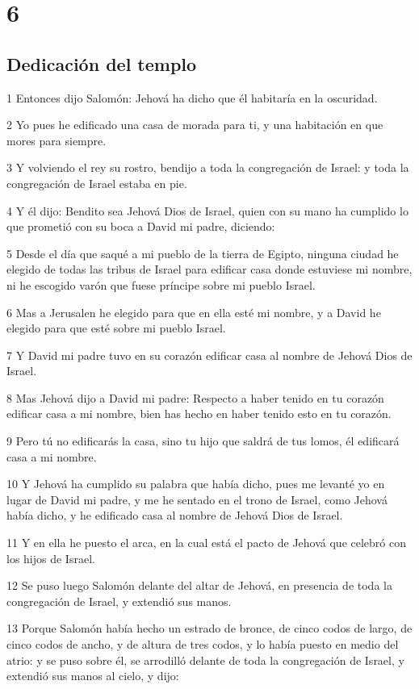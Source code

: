 \chapter{6}

\section*{Dedicación del templo}

\par 1 Entonces dijo Salomón: Jehová ha dicho que él habitaría en la oscuridad.
\par 2 Yo pues he edificado una casa de morada para ti, y una habitación en que mores para siempre.
\par 3 Y volviendo el rey su rostro, bendijo  a  toda la congregación de Israel: y toda la congregación de Israel estaba en pie.
\par 4 Y él dijo: Bendito sea Jehová Dios de Israel, quien con su mano ha cumplido lo que prometió con su boca  a  David mi padre, diciendo:
\par 5 Desde el día que saqué a mi pueblo de la tierra de Egipto, ninguna ciudad he elegido de todas las tribus de Israel para edificar casa donde estuviese mi nombre, ni he escogido varón que fuese príncipe sobre mi pueblo Israel.
\par 6 Mas  a  Jerusalen he elegido para que en ella esté mi nombre, y  a  David he elegido para que esté sobre mi pueblo Israel.
\par 7 Y David mi padre tuvo en su corazón edificar casa al nombre de Jehová Dios de Israel.
\par 8 Mas Jehová dijo  a  David mi padre: Respecto  a  haber tenido en tu corazón edificar casa  a  mi nombre, bien has hecho en haber tenido esto en tu corazón.
\par 9 Pero tú no edificarás la casa, sino tu hijo que saldrá de tus lomos, él edificará casa  a  mi nombre. 
\par 10 Y Jehová ha cumplido su palabra que había dicho, pues me levanté yo en lugar de David mi padre, y me he sentado en el trono de Israel, como Jehová había dicho, y he edificado casa al nombre de Jehová Dios de Israel.
\par 11 Y en ella he puesto el arca, en la cual está el pacto de Jehová que celebró con los hijos de Israel.
\par 12 Se puso luego Salomón delante del altar de Jehová, en presencia de toda la congregación de Israel, y extendió sus manos.
\par 13 Porque Salomón había hecho un estrado de bronce, de cinco codos   de largo, de cinco codos de ancho, y de altura de tres codos, y lo había puesto en medio del atrio: y se puso sobre él, se arrodilló delante de toda la congregación de Israel, y extendió sus manos al cielo, y dijo:

